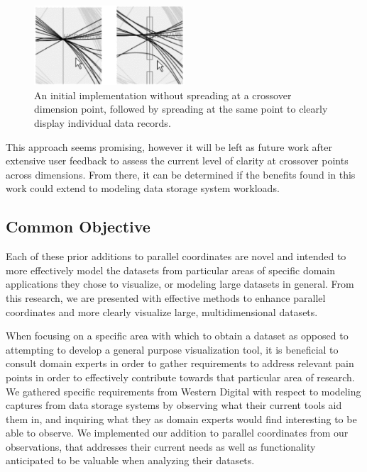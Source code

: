 \documentclass[journal]{vgtc}                %
\begin{document}
\begin{figure}[h!]
 \centering
 \includegraphics[width=0.5\textwidth]{images/spread.eps}
 \caption[Spreading at a crossover point to display individual data records.]{An initial implementation without spreading at a crossover dimension point, followed by spreading at the same point to clearly display individual data records.}
 \label{fig:curves2}
\end{figure}

This approach seems promising, however it will be left as future work after extensive user feedback to assess the current level of clarity at crossover points across dimensions. From there, it can be determined if the benefits found in this work could extend to modeling data storage system workloads.

\subsection{Common Objective}
\label{common_objective}
Each of these prior additions to parallel coordinates are novel and intended to more effectively model the datasets from particular areas of specific domain applications they chose to visualize, or modeling large datasets in general. From this research, we are presented with effective methods to enhance parallel coordinates and more clearly visualize large, multidimensional datasets.

When focusing on a specific area with which to obtain a dataset as opposed to attempting to develop a general purpose visualization tool, it is beneficial to consult domain experts in order to gather requirements to address relevant pain points in order to effectively contribute towards that particular area of research. We gathered specific requirements from Western Digital with respect to modeling captures from data storage systems by observing what their current tools aid them in, and inquiring what they as domain experts would find interesting to be able to observe. We implemented our addition to parallel coordinates from our observations, that addresses their current needs as well as functionality anticipated to be valuable when analyzing their datasets.
\end{document}
